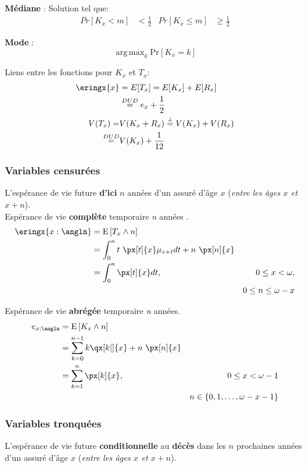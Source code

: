 \documentclass[10pt, french]{article}
\DeclareMathOperator*{\argmax}{arg\,max}
\begin{document}
\begin{multicols*}{3}
\textbf{Médiane} : Solution tel que:
	\begin{align*}
		Pr[K_x < m] &< \frac{1}{2} &
		Pr[K_x \leq m] &\geq \frac{1}{2} 
	\end{align*}

\textbf{Mode} : 
	\[ \argmax_k \text{Pr}[K_x = k] \]


Liens entre les fonctions pour $K_x$ et $T_x$:\\
\begin{align*}
	\eringx{x} &= E[T_x] = E[K_x] + E[R_x] \\
	&\stackrel{DUD}= e_x + \frac{1}{2} \\
	V(T_x) = &V(K_x + R_x) \stackrel{\bot}= V(K_x) + V(R_x) \\
	\stackrel{DUD}= &V(K_x) + \frac{1}{12} 
\end{align*}

\subsubsection*{Variables censurées}
L'espérance de vie future \textbf{d'ici} $n$ années d'un assuré d'âge $x$ (\textit{entre les âges $x$ et $x+n$}).\\

Espérance de vie \textbf{complète} temporaire \textit{n} années .
\begin{align*}
\eringx{x:\angln} &= \esp{T_x \wedge n} \\
&= \int_0^{n}t \ \px[t]{x} \mu_{x + t} dt + n \ \px[n]{x} \\
&= \int_0^{n} \px[t]{x} dt, & 0 \leq x < \omega, \\
&& 0 \leq n \leq \omega - x 
\end{align*}

Espérance de vie \textbf{abrégée} temporaire \textit{n} années.
\begin{align*}
e_{x:\angln} &= \esp{K_x \wedge n} \\
&= \sum_{k = 0}^{n - 1} k \qx[k | ]{x} + n \ \px[n]{x} \\
&= \sum_{k = 1}^{n} \px[k]{x}, & 0 \leq x < \omega - 1 \\
&& n \in \{0, 1, \dots, \omega - x - 1\}
\end{align*}

\subsubsection*{Variables tronquées}
L'espérance de vie future \textbf{conditionnelle} au \textbf{décès} dans les $n$ prochaines années d'un assuré d'âge $x$ (\textit{entre les âges $x$ et $x+n$}).


\end{multicols*}
\end{document}
